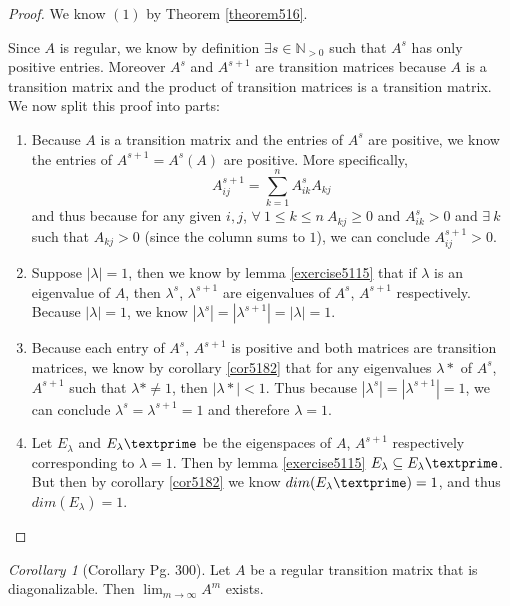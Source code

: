 \documentclass{amsart}
\theoremstyle{definition}
\theoremstyle{remark}
\newtheorem{corollary}{Corollary}[theorem]
\numberwithin{equation}{section}
\begin{document}
\begin{proof}

We know $(1)$ by Theorem \ref{theorem516}.

Since $A$ is regular, we know by definition $\exists s \in \mathbb{N}_{>0}$ such that $A^s$ has only positive entries.
Moreover $A^s$ and $A^{s+1}$ are transition matrices because $A$ is a transition matrix and the product of transition matrices is a transition matrix.
We now split this proof into parts:

\begin{enumerate}
    \item
        Because $A$ is a transition matrix and the entries of $A^s$ are positive, we know the entries of $A^{s+1} = A^s(A)$ are positive.
        More specifically,
        $$A^{s+1}_{ij} = \sum_{k = 1}^nA^s_{ik}A_{kj}$$
        and thus because for any given $i, j$, $\forall\ 1 \leq k \leq n\ A_{kj} \geq 0$ and $A^s_{ik} > 0$
        and $\exists\ k$ such that $A_{kj}  > 0$ (since the column sums to $1$), we can conclude $A^{s+1}_{ij} > 0$.

    \item
        Suppose $|\lambda| = 1$, then we know by lemma \ref{exercise5115} that if $\lambda$ is an eigenvalue of $A$, then
        $\lambda^s$, $\lambda^{s+1}$ are eigenvalues of $A^s$, $A^{s+1}$ respectively.  Because $|\lambda| = 1$, we know $ |\lambda^s |= |\lambda^{s+1} |= |\lambda| = 1$.

    \item
        Because each entry of $A^s$, $A^{s+1}$ is positive and both matrices are transition matrices,
        we know by corollary \ref{cor5182} that for any eigenvalues $\lambda*$ of $A^s$, $A^{s+1}$ such that $\lambda* \neq 1$, then $|\lambda*| < 1$.
        Thus because $|\lambda^s |= |\lambda^{s+1} |= 1 $, we can conclude $\lambda^s = \lambda^{s+1} = 1$ and therefore $\lambda = 1$.
    \item

        Let $E_{\lambda}$ and $E_{\lambda}\textprime$ be the eigenspaces of $A$, $A^{s+1}$ respectively corresponding to $\lambda = 1$.
        Then by lemma \ref{exercise5115} $E_{\lambda} \subseteq E_{\lambda}\textprime$.
        But then by corollary \ref{cor5182} we know $dim(E_{\lambda}\textprime) = 1$, and thus $dim(E_{\lambda}) = 1$.
\end{enumerate}

\end{proof}


\begin{corollary}[Corollary Pg. 300]\label{cor519}
Let $A$ be a regular transition matrix that is diagonalizable.
Then $\lim_{m \to \infty} A^m$ exists.

\end{corollary}
\end{document}
